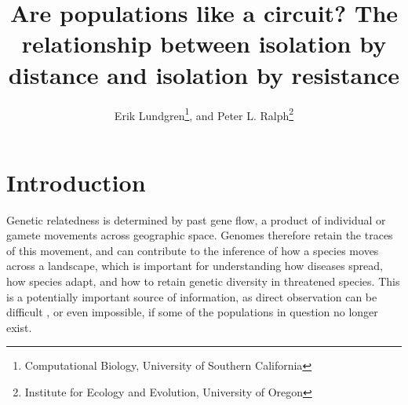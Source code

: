 \documentclass{article}
\begin{document}
\title{Are populations like a circuit? The relationship between isolation by distance and isolation by resistance}
\author{Erik Lundgren\footnote{Computational Biology, University of Southern California}, and
        Peter L. Ralph\footnote{Institute for Ecology and Evolution, University of Oregon}}
\maketitle

\begin{abstract}
\end{abstract}



\section*{Introduction}

Genetic relatedness is determined by past gene flow,
a product of individual or gamete movements across geographic space.
Genomes therefore retain the traces of this movement,
and can contribute to the inference of how a species moves across a landscape,
which is important for understanding how diseases spread, how species adapt,
and how to retain genetic diversity in threatened species.
This is a potentially important source of information,
as direct observation can be difficult \citep[especially of long-distance movement]{dispersal_estimation},
or even impossible, if some of the populations in question no longer exist.
\end{document}
